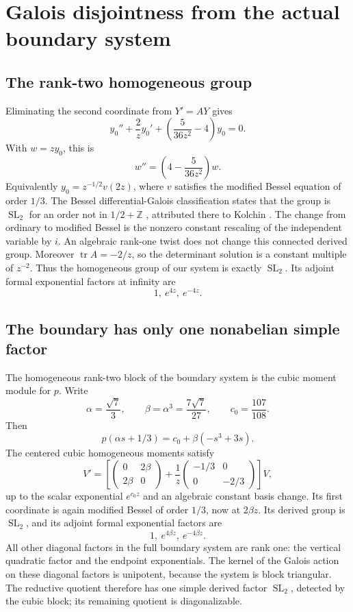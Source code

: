 \documentclass[11pt]{article}
\numberwithin{equation}{section}
\theoremstyle{definition}
\theoremstyle{remark}
\newcommand{\Z}{\mathbb Z}
\newcommand{\SL}{\operatorname{SL}}
\begin{document}
\section{Galois disjointness from the actual boundary system}
\subsection{The rank-two homogeneous group}
Eliminating the second coordinate from $Y'=AY$ gives
\[
 y_0''+\frac2z y_0'+\left(\frac5{36z^2}-4\right)y_0=0.
\]
With $w=zy_0$, this is
\[
 w''=\left(4-\frac5{36z^2}\right)w.
\]
Equivalently $y_0=z^{-1/2}v(2z)$, where $v$ satisfies the modified Bessel
equation of order $1/3$. The Bessel differential-Galois classification
states that the group is $\SL_2$ for an order not in
$1/2+\Z$ \cite[Example~1.3.32, group statement]{Singer}, attributed
there to Kolchin \cite{Kolchin1968}. The change from ordinary to modified
Bessel is the nonzero constant rescaling of the independent variable by
$i$. An algebraic rank-one twist does
not change this connected derived group. Moreover $\operatorname{tr}A=-2/z$,
so the determinant solution is a constant multiple of $z^{-2}$. Thus the
homogeneous group of our system is exactly $\SL_2$.
Its adjoint formal exponential factors at infinity are
\begin{equation}\label{eq:ell-adjoint}
 1,\ e^{4z},\ e^{-4z}.
\end{equation}

\subsection{The boundary has only one nonabelian simple factor}
The homogeneous rank-two block of the boundary system is the cubic moment
module for $p$. Write
\[
 \alpha=\frac{\sqrt7}{3},\qquad
 \beta=\alpha^3=\frac{7\sqrt7}{27},\qquad c_0=\frac{107}{108}.
\]
Then
\begin{equation}\label{eq:pnormal}
 p(\alpha s+1/3)=c_0+\beta(-s^3+3s).
\end{equation}
The centered cubic homogeneous moments satisfy
\[
 V'=\left[
 \begin{pmatrix}0&2\beta\\2\beta&0\end{pmatrix}
 +\frac1z\begin{pmatrix}-1/3&0\\0&-2/3\end{pmatrix}
 \right]V,
\]
up to the scalar exponential $e^{c_0z}$ and an algebraic constant basis
change. Its first coordinate is again modified Bessel of order $1/3$,
now at $2\beta z$. Its derived group is $\SL_2$, and its adjoint formal
exponential factors are
\begin{equation}\label{eq:boundary-adjoint}
 1,\ e^{4\beta z},\ e^{-4\beta z}.
\end{equation}
All other diagonal factors in the full boundary system are rank one:
the vertical quadratic factor and the endpoint exponentials. The kernel of
the Galois action on these diagonal factors is unipotent, because the
system is block triangular. The reductive quotient therefore has one
simple derived factor $\SL_2$, detected by the cubic block; its remaining
quotient is diagonalizable.
\end{document}
